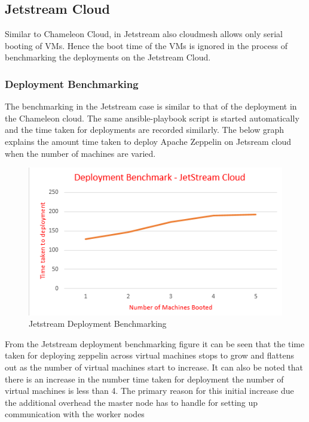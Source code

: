 \documentclass[9pt,twocolumn,twoside]{../../styles/osajnl}
\begin{document}
	\subsection{Jetstream Cloud}
	
	Similar to Chameleon Cloud, in Jetstream also cloudmesh allows 
	only 
	serial booting of VMs. Hence the boot time of the VMs is ignored 
	in 
	the process of benchmarking the deployments on the Jetstream 
	Cloud.
	
	
	\subsubsection{Deployment Benchmarking}
	
	The benchmarking in the Jetstream case is similar to that of the 
	deployment in the Chameleon cloud. The same ansible-playbook 
	script 
	is started automatically and the time taken for deployments are 
	recorded similarly. The below graph explains the amount time 
	taken to 
	deploy Apache Zeppelin on Jetsream cloud when the number of 
	machines 
	are varied.
	
	\begin{figure}
		\includegraphics[width=\linewidth]{./images/jetstream_deployment_time}
		\caption{Jetstream Deployment Benchmarking}
		\label{fig:Jetstream Deployment Benchmarking}
	\end{figure}
	
	From the Jetstream deployment benchmarking figure it can be seen 
	that 
	the time taken for deploying zeppelin across virtual machines 
	stops 
	to grow and flattens out as the number of virtual machines start 
	to 
	increase. It can also be noted that there is an increase in the 
	number time taken for deployment the number of virtual machines 
	is 
	less than 4. The primary reason for this initial increase due the 
	additional overhead the master node has to handle for setting up 
	communication with the worker nodes
	
\end{document}
